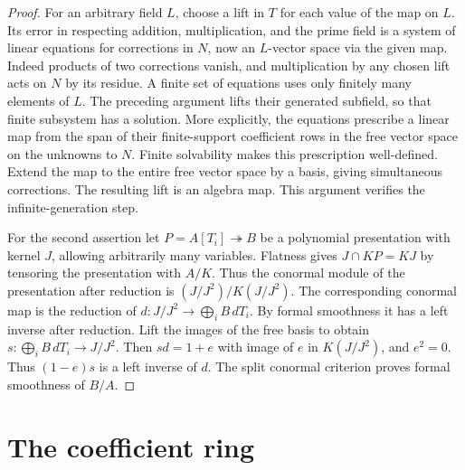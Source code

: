\documentclass[11pt,oneside,openany]{book}
\theoremstyle{definition}
\theoremstyle{remark}
\begin{document}
\begin{proof}
For an arbitrary field \(L\), choose a lift in \(T\) for each value
of the map on \(L\). Its error in respecting addition, multiplication,
and the prime field is a system of linear equations for corrections in
\(N\), now an \(L\)-vector space via the given map. Indeed products of
two corrections vanish, and multiplication by any chosen lift acts
on \(N\) by its residue. A finite set of equations uses only finitely
many elements of \(L\). The preceding argument lifts their generated
subfield, so that finite subsystem has a solution. More explicitly,
the equations prescribe a linear map from the span of their
finite-support coefficient rows in the free vector space on the
unknowns to \(N\). Finite solvability makes this prescription
well-defined. Extend the map to the entire free vector space by a
basis, giving simultaneous corrections. The resulting lift is an
algebra map. This argument verifies the infinite-generation step.

For the second assertion let \(P=A[T_i]\twoheadrightarrow B\) be
a polynomial presentation with kernel \(J\), allowing arbitrarily many
variables. Flatness gives \(J\cap KP=KJ\) by tensoring the presentation
with \(A/K\). Thus the conormal module of the presentation after
reduction is \((J/J^2)/K(J/J^2)\). The corresponding conormal map
is the reduction of \(d:J/J^2\to\bigoplus_i B\,dT_i\). By formal
smoothness it has a left inverse after reduction. Lift the images
of the free basis to obtain \(s:\bigoplus_i B\,dT_i\to J/J^2\).
Then \(sd=1+e\) with image of \(e\) in \(K(J/J^2)\), and \(e^2=0\).
Thus \((1-e)s\) is a left inverse of \(d\). The split conormal
criterion proves formal smoothness of \(B/A\).
\end{proof}

\section{The coefficient ring}
\end{document}
